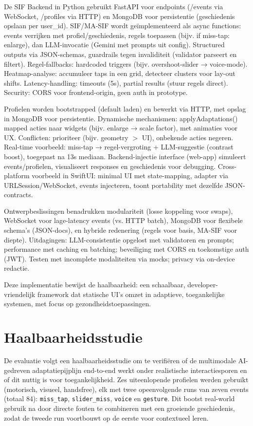 \documentclass[openany]{book}
\begin{document}
De SIF Backend in Python gebruikt FastAPI voor endpoints (/events via WebSocket, /profiles via HTTP) en MongoDB voor persistentie (geschiedenis opslaan per user\_id). SIF/MA-SIF wordt geïmplementeerd als async functions: events verrijken met profiel/geschiedenis, regels toepassen (bijv. if miss-tap: enlarge), dan LLM-invocatie (Gemini met prompts uit config). Structured outputs via JSON-schemas, guardrails tegen invaliditeit (validator parseert en filtert). Regel-fallbacks: hardcoded triggers (bijv. overshoot-slider → voice-mode). Heatmap-analyse: accumuleer taps in een grid, detecteer clusters voor lay-out shifts. Latency-handling: timeouts (5s), partial results (stuur regels direct). Security: CORS voor frontend-origin, geen auth in prototype.

Profielen worden bootstrapped (default laden) en bewerkt via HTTP, met opslag in MongoDB voor persistentie. Dynamische mechanismen: applyAdaptations() mapped acties naar widgets (bijv. enlarge → scale factor), met animaties voor UX. Conflicten: prioriteer (bijv. geometry $>$ UI), onbekende acties negeren. Real-time voorbeeld: miss-tap → regel-vergroting + LLM-suggestie (contrast boost), toegepast na 13s mediaan.
Backend-injectie interface (web-app) simuleert events/profielen, visualiseert responses en geschiedenis voor debugging. Cross-platform voorbeeld in SwiftUI: minimal UI met state-mapping, adapter via URLSession/WebSocket, events injecteren, toont portability met dezelfde JSON-contracts.

Ontwerpbeslissingen benadrukken modulariteit (losse koppeling voor swaps), WebSocket voor lage-latency events (vs. HTTP batch), MongoDB voor flexibele schema's (JSON-docs), en hybride redenering (regels voor basis, MA-SIF voor diepte). Uitdagingen: LLM-consistentie opgelost met validatoren en prompts; performance met caching en batching; beveiliging met CORS en toekomstige auth (JWT). Testen met incomplete modaliteiten via mocks; privacy via on-device redactie.

Deze implementatie bewijst de haalbaarheid: een schaalbaar, developer-vriendelijk framework dat statische UI's omzet in adaptieve, toegankelijke systemen, met focus op gezondheidstoepassingen.

\section*{Haalbaarheidsstudie}
De evaluatie volgt een haalbaarheidsstudie om te verifiëren of de multimodale AI-gedreven adaptatiepijplijn end-to-end werkt onder realistische interactiesporen en of dit nuttig is voor toegankelijkheid. Zes uiteenlopende profielen werden gebruikt (motorisch, visueel, handsfree), elk met twee opeenvolgende runs van zeven events (totaal 84): \texttt{miss\_tap}, \texttt{slider\_miss}, \texttt{voice} en \texttt{gesture}. Dit bootst real-world gebruik na door directe fouten te combineren met een groeiende geschiedenis, zodat de tweede run voortbouwt op de eerste voor contextueel leren.
\end{document}
